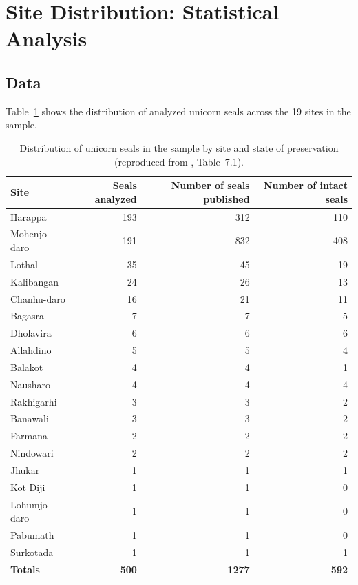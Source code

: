 \documentclass[12pt]{article}
\begin{document}
\section{Site Distribution: Statistical Analysis}
\label{sec:site_stats}

\subsection{Data}

Table~\ref{tab:sites} shows the distribution of analyzed unicorn seals across the 19 sites in the sample.

\begin{table}[H]
\centering
\caption{Distribution of unicorn seals in the sample by site and state of preservation
(reproduced from \citealt{jamison2017}, Table~7.1).}
\label{tab:sites}
\begin{tabular}{@{}lrrr@{}}
\toprule
Site & Seals analyzed & Number of seals published & Number of intact seals \\
\midrule
Harappa       & 193 & 312 & 110 \\
Mohenjo-daro  & 191 & 832 & 408 \\
Lothal        & 35  & 45  & 19 \\
Kalibangan    & 24  & 26  & 13 \\
Chanhu-daro   & 16  & 21  & 11 \\
Bagasra       & 7   & 7   & 5 \\
Dholavira     & 6   & 6   & 6 \\
Allahdino     & 5   & 5   & 4 \\
Balakot       & 4   & 4   & 1 \\
Nausharo      & 4   & 4   & 4 \\
Rakhigarhi    & 3   & 3   & 2 \\
Banawali      & 3   & 3   & 2 \\
Farmana       & 2   & 2   & 2 \\
Nindowari     & 2   & 2   & 2 \\
Jhukar        & 1   & 1   & 1 \\
Kot Diji      & 1   & 1   & 0 \\
Lohumjo-daro  & 1   & 1   & 0 \\
Pabumath      & 1   & 1   & 0 \\
Surkotada     & 1   & 1   & 1 \\
\midrule
\textbf{Totals} & \textbf{500} & \textbf{1277} & \textbf{592} \\
\bottomrule
\end{tabular}
\end{table}
\end{document}
